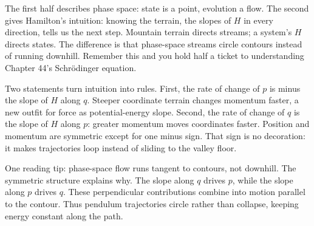 The first half describes phase space: state is a point, evolution a flow. The second gives Hamilton's intuition: knowing the terrain, the slopes of \(H\) in every direction, tells us the next step. Mountain terrain directs streams; a system's \(H\) directs states. The difference is that phase-space streams circle contours instead of running downhill. Remember this and you hold half a ticket to understanding Chapter 44's Schrödinger equation.


\begin{mainline}
Two statements turn intuition into rules. First, the rate of change of \(p\) is minus the slope of \(H\) along \(q\). Steeper coordinate terrain changes momentum faster, a new outfit for force as potential-energy slope. Second, the rate of change of \(q\) is the slope of \(H\) along \(p\): greater momentum moves coordinates faster. Position and momentum are symmetric except for one minus sign. That sign is no decoration: it makes trajectories loop instead of sliding to the valley floor.

One reading tip: phase-space flow runs tangent to contours, not downhill. The symmetric structure explains why. The slope along \(q\) drives \(p\), while the slope along \(p\) drives \(q\). These perpendicular contributions combine into motion parallel to the contour. Thus pendulum trajectories circle rather than collapse, keeping energy constant along the path.
\end{mainline}


